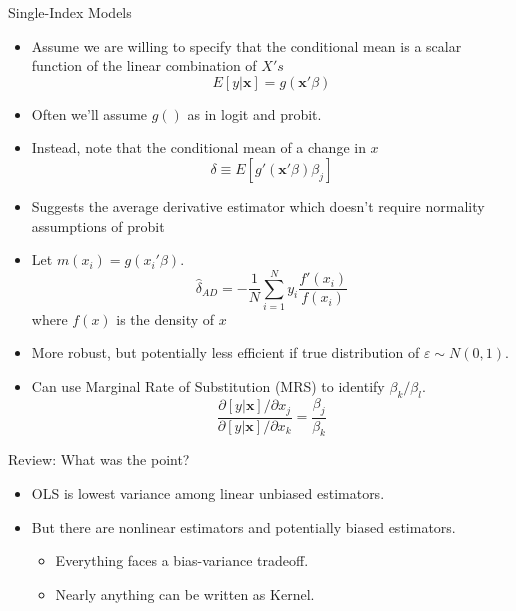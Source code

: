 \begin{frame}[allowframebreaks]{Single-Index Models}
   
  \begin{itemize}
  \item Assume we are willing to specify that the conditional mean is a scalar function of the linear combination of $X's$ 
  $$ E \left[ y | \mathbf{x} \right] = g(\mathbf{x}'\beta ) $$ 
  \item Often we'll assume $g()$ as in logit and probit. 
  \item Instead, note that the conditional mean of a change in $x$ 
  $$ \delta \equiv E \left[g'(\mathbf{x}'\beta ) \beta_j \right] $$ 
  
  \item Suggests the \alert{average derivative estimator} which doesn't require normality assumptions of probit
  \item Let $m(x_i) = g(x_i'\beta)$. 
  $$ \hat \delta_{AD} = -\frac{1}{N} \sum_{i=1}^N y_i \frac{f'(x_i)}{f(x_i)} $$
  where $f(x)$ is the density of $x$

  \item More robust, but potentially less efficient if true distribution of $\varepsilon \sim N(0,1)$.
 
  \item Can use Marginal Rate of Substitution (MRS) to identify $\beta_k / \beta_l$.
  $$ \frac{ \partial \left[ y | \mathbf{x} \right] / \partial x_j }{ \partial \left[ y | \mathbf{x} \right] / \partial x_k} = \frac{\beta_j}{\beta_k} $$ 
  
   \end{itemize}
\end{frame}

\begin{frame}{Review: What was the point?}
\begin{itemize}
\item OLS is lowest variance among linear unbiased estimators.
\item But there are \alert{nonlinear} estimators and potentially \alert{biased} estimators.
\begin{itemize}
\item Everything faces a \alert{bias-variance} tradeoff.
\item Nearly anything can be written as Kernel.
\end{itemize}
\end{itemize}
\end{frame}

